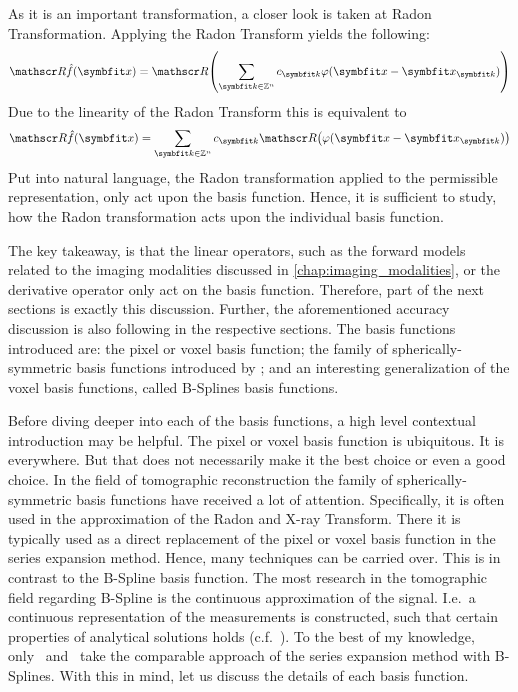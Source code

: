 As it is an important transformation, a closer look is taken at Radon Transformation. Applying the
Radon Transform yields the following:
\begin{equation}
	\radon\near{f}(\mvec{x}) = \radon\left( \sum_{\mvec{k} \in \mathbb{Z}^n} c_{\mvec{k}} \varphi(\mvec{x} - \mvec{x}_{\mvec{k}}) \right)
\end{equation}
Due to the linearity of the Radon Transform this is equivalent to
\begin{equation}
	\radon\hat{f}(\mvec{x}) = \sum_{\mvec{k} \in \mathbb{Z}^n} c_{\mvec{k}}\radon\left( \varphi(\mvec{x} - \mvec{x}_{\mvec{k}}) \right)
\end{equation}
Put into natural language, the Radon transformation applied to the permissible representation, only
act upon the basis function. Hence, it is sufficient to study, how the Radon transformation acts
upon the individual basis function.

The key takeaway, is that the linear operators, such as the forward models related to the imaging
modalities discussed in \autoref{chap:imaging_modalities}, or the derivative operator only act on
the basis function. Therefore, part of the next sections is exactly this discussion. Further, the
aforementioned accuracy discussion is also following in the respective sections. The basis functions
introduced are: the pixel or voxel basis function; the family of spherically-symmetric basis
functions introduced by \citeauthor*{lewitt_multidimensional_1990}; and an interesting
generalization of the voxel basis functions, called B-Splines basis functions.

Before diving deeper into each of the basis functions, a high level contextual introduction may be
helpful. The pixel or voxel basis function is ubiquitous. It is everywhere. But that does not
necessarily make it the best choice or even a good choice. In the field of tomographic
reconstruction the family of spherically-symmetric basis functions have received a lot of attention.
Specifically, it is often used in the approximation of the Radon and X-ray Transform. There it is
typically used as a direct replacement of the pixel or voxel basis function in the series expansion
method. Hence, many techniques can be carried over. This is in contrast to the B-Spline basis
function. The most research in the tomographic field regarding B-Spline is the continuous
approximation of the signal. I.e.\ a continuous representation of the measurements is constructed,
such that certain properties of analytical solutions holds (c.f.~\cite{horbelt_discretization_2002}).
To the best of my knowledge, only~\cite{nilchian_fast_2013}
and~\cite{momey_new_2011,momey_b-spline_2012,momey_spline_2015} take the comparable approach of the
series expansion method with B-Splines. With this in mind, let us discuss the details of each basis
function.


